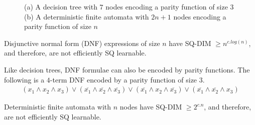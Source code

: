 \begin{figure}
    \centering
    \caption{(a) A decision tree with $7$ nodes encoding a parity function of size $3$ (b) A deterministic finite automata with $2n + 1$ nodes encoding a parity function of size $n$}
\end{figure}
 

\begin{proposition}
Disjunctive normal form (DNF) expressions of size $n$ have SQ-DIM $\geq n^{c.log(n)}$, and therefore, are not efficiently SQ learnable.
\end{proposition}

Like decision trees, DNF formulae can also be encoded by parity functions. The following is a $4$-term DNF encoded by a parity function of size $3$.
\begin{align*}
    (x_1 \wedge x_2 \wedge x_3) \vee (\overline{x_1} \wedge \overline{x_2} \wedge \overline{x_3}) \vee (\overline{x_1} \wedge x_2 \wedge \overline{x_3}) \vee (\overline{x_1} \wedge \overline{x_2} \wedge x_3)
\end{align*}

\begin{proposition}
Deterministic finite automata with $n$ nodes have SQ-DIM $\geq 2^{c.n}$, and therefore, are not efficiently SQ learnable.
\end{proposition}

